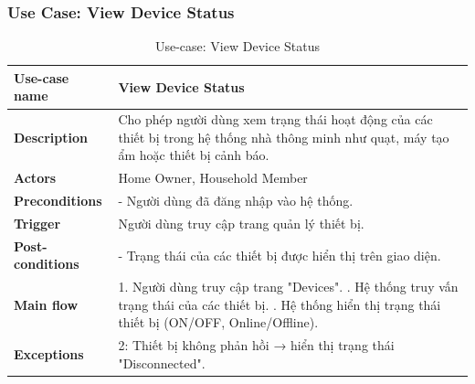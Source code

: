 \documentclass[a4paper,twoside]{article}
\begin{document}
\subsubsection{Use Case: View Device Status}
\begin{table}[H]
\centering
\begin{tabular}{|p{4cm}|p{11cm}|}
\hline
\textbf{Use-case name} & View Device Status \\ \hline

\textbf{Description} &
Cho phép người dùng xem trạng thái hoạt động của các thiết bị
trong hệ thống nhà thông minh như quạt, máy tạo ẩm hoặc thiết bị cảnh báo. \\ \hline

\textbf{Actors} &
Home Owner, Household Member \\ \hline

\textbf{Preconditions} &
- Người dùng đã đăng nhập vào hệ thống. \\ \hline

\textbf{Trigger} &
Người dùng truy cập trang quản lý thiết bị. \\ \hline

\textbf{Post-conditions} &
- Trạng thái của các thiết bị được hiển thị trên giao diện. \\ \hline

\textbf{Main flow} &
1. Người dùng truy cập trang "Devices". \newline
2. Hệ thống truy vấn trạng thái của các thiết bị. \newline
3. Hệ thống hiển thị trạng thái thiết bị (ON/OFF, Online/Offline). \\ \hline

\textbf{Exceptions} &
2: Thiết bị không phản hồi → hiển thị trạng thái "Disconnected". \\ \hline
\end{tabular}
\caption{Use-case: View Device Status}
\end{table}


\end{document}
